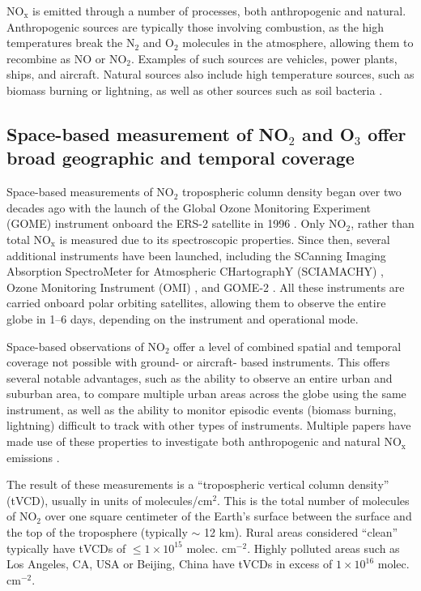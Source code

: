 \documentclass[a4paper,10pt,oneside]{article}
\newcommand{\ce}[1]{$\mathrm{#1}$}
\begin{document}
\begin{sloppy}
\ce{NO_x} is emitted through a number of processes, both anthropogenic and natural. Anthropogenic sources are typically those involving combustion, as the high temperatures break the \ce{N_2} and \ce{O_2} molecules in the atmosphere, allowing them to recombine as \ce{NO} or \ce{NO_2}. Examples of such sources are vehicles, power plants, ships, and aircraft. Natural sources also include high temperature sources, such as biomass burning or lightning, as well as other sources such as soil bacteria \cite{monks-beirle}.

\subsection{Space-based measurement of NO$_2$ and O$_3$ offer broad geographic and temporal coverage}

Space-based measurements of \ce{NO_2} tropospheric column density began over two decades ago with the launch of the Global Ozone Monitoring Experiment (GOME) instrument onboard the ERS-2 satellite in 1996 \cite{burrows99}. Only \ce{NO_2}, rather than total \ce{NO_x} is measured due to its spectroscopic properties. Since then, several additional instruments have been launched, including the SCanning Imaging Absorption SpectroMeter for Atmospheric CHartographY (SCIAMACHY) \cite{bovensmann99}, Ozone Monitoring Instrument (OMI) \cite{levelt06}, and GOME-2 \cite{callies00}. All these instruments are carried onboard polar orbiting satellites, allowing them to observe the entire globe in 1--6 days, depending on the instrument and operational mode.

Space-based observations of \ce{NO_2} offer a level of combined spatial and temporal coverage not possible with ground- or aircraft- based instruments.  This offers several notable advantages, such as the ability to observe an entire urban and suburban area, to compare multiple urban areas across the globe using the same instrument, as well as the ability to monitor episodic events (biomass burning, lightning) difficult to track with other types of instruments.  Multiple papers have made use of these properties to investigate both anthropogenic \cite{ding15, lamsal15, tong15, huang14, vinken14, gu13, miyazaki12, russell12, lin10, kim09} and natural \ce{NO_x} emissions \cite{miyazaki14, beirle10, castellanos14, mebust14, mebust13, zorner16}.

The result of these measurements is a ``tropospheric vertical column density'' (tVCD), usually in units of molecules/cm$^2$. This is the total number of molecules of \ce{NO_2} over one square centimeter of the Earth's surface between the surface and the top of the troposphere (typically $\sim$ 12 km). Rural areas considered ``clean'' typically have tVCDs of $\leq 1 \times 10^{15}$ molec. cm$^{-2}$. Highly polluted areas such as Los Angeles, CA, USA or Beijing, China have tVCDs in excess of $1 \times 10^{16}$ molec. cm$^{-2}$.


\end{sloppy}
\end{document}
